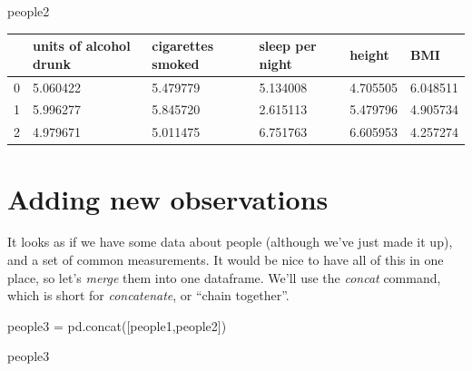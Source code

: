 \documentclass[
  letterpaper,
  DIV=11,
  numbers=noendperiod]{scrreprt}
\newenvironment{Shaded}{\begin{snugshade}}{\end{snugshade}}
\newcommand{\NormalTok}[1]{\textcolor[rgb]{0.00,0.23,0.31}{#1}}
\newcommand{\OperatorTok}[1]{\textcolor[rgb]{0.37,0.37,0.37}{#1}}
\begin{document}
\begin{Shaded}
\begin{Highlighting}[]
\NormalTok{people2}
\end{Highlighting}
\end{Shaded}

\begin{longtable}[]{@{}llllll@{}}
\toprule()
& units of alcohol drunk & cigarettes smoked & sleep per night & height
& BMI \\
\midrule()
\endhead
0 & 5.060422 & 5.479779 & 5.134008 & 4.705505 & 6.048511 \\
1 & 5.996277 & 5.845720 & 2.615113 & 5.479796 & 4.905734 \\
2 & 4.979671 & 5.011475 & 6.751763 & 6.605953 & 4.257274 \\
\bottomrule()
\end{longtable}


\hypertarget{adding-new-observations}{%
\chapter{Adding new observations}\label{adding-new-observations}}

It looks as if we have some data about people (although we've just made
it up), and a set of common measurements. It would be nice to have all
of this in one place, so let's \emph{merge} them into one dataframe.
We'll use the \emph{concat} command, which is short for
\emph{concatenate}, or ``chain together''.

\begin{Shaded}
\begin{Highlighting}[]
\NormalTok{people3 }\OperatorTok{=}\NormalTok{ pd.concat([people1,people2])}
\end{Highlighting}
\end{Shaded}

\begin{Shaded}
\begin{Highlighting}[]
\NormalTok{people3}
\end{Highlighting}
\end{Shaded}
\end{document}

